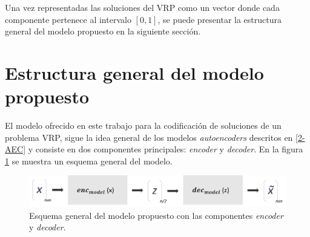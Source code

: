 

Una vez representadas las soluciones del VRP como un vector donde cada componente pertenece al intervalo $[0, 1]$, se puede presentar la estructura general del modelo propuesto en la siguiente sección.



\section{Estructura general del modelo propuesto}\label{3-GenStruct}

El modelo ofrecido en este trabajo para la codificación de soluciones de un problema VRP, sigue la idea general de los modelos \textit{autoencoders} descritos en \ref{2-AEC} y consiste en dos componentes principales:  \textit{encoder} y \textit{decoder}. En la figura \ref{modelGeneral} se muestra un esquema general del modelo.

\begin{figure}[!h]
	\centering
	\includegraphics[width=5in]{Graphics/model general.png}
	
	\caption{ \small{Esquema general del modelo propuesto con las componentes \textit{encoder} y \textit{decoder}.}}
	
	\label{modelGeneral}
\end{figure}  

